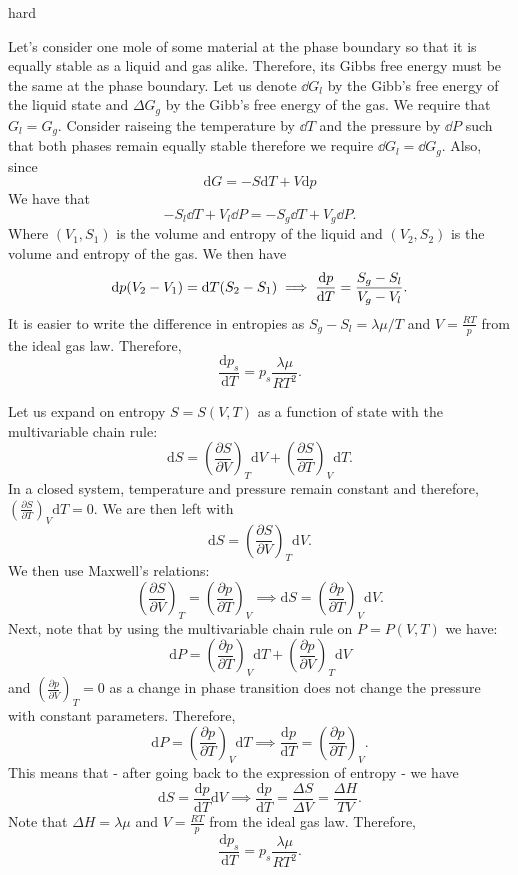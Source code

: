 \begin{solution}{hard}
\tcbline 

Let's consider one mole of some material at the phase boundary so that it is equally stable as a liquid and gas alike. Therefore, its Gibbs free energy must be the same at the phase boundary. Let us denote $\dd G_l$ by the Gibb’s free energy of the liquid state and $\Delta G_g$ by the Gibb’s free energy of the gas. We require that $G_l = G_g$. Consider raiseing the temperature by $\dd T$ and the pressure by $\dd P$ such that both phases remain equally stable therefore we require $\dd G_l = \dd G_g$. Also, since 
\[\text{d}G = -S\text{d}T + V\text{d}p\]
We have that 
\[-S_l \dd T + V_l \dd P = -S_g \dd T + V_g \dd P.\]
Where $(V_1, S_1)$ is the volume and entropy of the liquid and $(V_2, S_2)$ is the volume and entropy of the gas. We then have 
\[\dd p (V_2 - V_1) = \dd T (S_2 - S_1)\implies \dv{p}{T} = \frac{S_g - S_l}{V_g - V_l}.\]
It is easier to write the difference in entropies as $S_g - S_l = \lambda\mu /T$ and $V = \frac{RT}{p}$ from the ideal gas law. Therefore,
\[\frac{\text{d}p_s}{\text{d}T} = p_s \frac{\lambda \mu}{RT^2}.\]

\tcbline 

Let us expand on entropy $S = S(V, T)$ as a function of state with the multivariable chain rule:
\[\text{d}S = \left(\frac{\partial S}{\partial V}\right)_T \text{d}V + \left(\frac{\partial S}{\partial T}\right)_V \text{d}T.\]
In a closed system, temperature and pressure remain constant and therefore, $\left(\frac{\partial S}{\partial T}\right)_V \text{d}T = 0$. We are then left with 
\[\text{d}S = \left(\frac{\partial S}{\partial V}\right)_T \text{d}V.\]
We then use Maxwell’s relations:
\[\left(\frac{\partial S}{\partial V}\right)_T = \left(\frac{\partial p}{\partial T}\right)_V\implies \text{d}S = \left(\frac{\partial p}{\partial T}\right)_V \text{d}V.\]
Next, note that by using the multivariable chain rule on $P = P(V, T)$ we have:
\[\text{d}P = \left(\frac{\partial p}{\partial T}\right)_V \text{d}T + \left(\frac{\partial p}{\partial V}\right)_T \text{d}V\]
and $\left(\frac{\partial p}{\partial V}\right)_T = 0$ as a change in phase transition does not change the pressure with constant parameters. Therefore, 
\[\text{d} P = \left(\frac{\partial p}{\partial T}\right)_V \text{d} T\implies \frac{\text{d}p}{\text{d}T} = \left(\frac{\partial p}{\partial T}\right)_V.\]
This means that - after going back to the expression of entropy - we have 
\[\text{d} S = \frac{\text{d}p}{\text{d}T} \text{d}V\implies \frac{\text{d}p}{\text{d}T} = \frac{\Delta S}{\Delta V} = \frac{\Delta H}{T V}.\]
Note that $\Delta H = \lambda \mu$ and $V = \frac{RT}{p}$ from the ideal gas law. Therefore, 
\[\frac{\text{d}p_s}{\text{d}T} = p_s \frac{\lambda \mu}{RT^2}.\]
\end{solution}